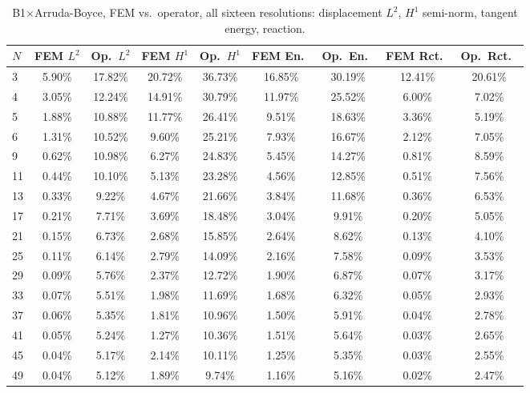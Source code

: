 \documentclass[final,5p,times]{elsarticle}
\begin{document}
\begin{table}[ht]
\centering
\caption{B1$\times$Arruda-Boyce, FEM vs.\ operator, all sixteen
  resolutions: displacement $L^2$, $H^1$ semi-norm, tangent energy,
  reaction.}
\label{tab:b1-b1ab-a}
\scriptsize
\begin{tabular}{lcccccccc}
\toprule
$N$ & FEM $L^2$ & Op.\ $L^2$ & FEM $H^1$ & Op.\ $H^1$ & FEM En.\ & Op.\ En.\ & FEM Rct.\ & Op.\ Rct.\ \\
\midrule
3  & 5.90\% & 17.82\% & 20.72\% & 36.73\% & 16.85\% & 30.19\% & 12.41\% & 20.61\% \\
4  & 3.05\% & 12.24\% & 14.91\% & 30.79\% & 11.97\% & 25.52\% & 6.00\%  & 7.02\%  \\
5  & 1.88\% & 10.88\% & 11.77\% & 26.41\% & 9.51\%  & 18.63\% & 3.36\%  & 5.19\%  \\
6  & 1.31\% & 10.52\% & 9.60\%  & 25.21\% & 7.93\%  & 16.67\% & 2.12\%  & 7.05\%  \\
9  & 0.62\% & 10.98\% & 6.27\%  & 24.83\% & 5.45\%  & 14.27\% & 0.81\%  & 8.59\%  \\
11 & 0.44\% & 10.10\% & 5.13\%  & 23.28\% & 4.56\%  & 12.85\% & 0.51\%  & 7.56\%  \\
13 & 0.33\% & 9.22\%  & 4.67\%  & 21.66\% & 3.84\%  & 11.68\% & 0.36\%  & 6.53\%  \\
17 & 0.21\% & 7.71\%  & 3.69\%  & 18.48\% & 3.04\%  & 9.91\%  & 0.20\%  & 5.05\%  \\
21 & 0.15\% & 6.73\%  & 2.68\%  & 15.85\% & 2.64\%  & 8.62\%  & 0.13\%  & 4.10\%  \\
25 & 0.11\% & 6.14\%  & 2.79\%  & 14.09\% & 2.16\%  & 7.58\%  & 0.09\%  & 3.53\%  \\
29 & 0.09\% & 5.76\%  & 2.37\%  & 12.72\% & 1.90\%  & 6.87\%  & 0.07\%  & 3.17\%  \\
33 & 0.07\% & 5.51\%  & 1.98\%  & 11.69\% & 1.68\%  & 6.32\%  & 0.05\%  & 2.93\%  \\
37 & 0.06\% & 5.35\%  & 1.81\%  & 10.96\% & 1.50\%  & 5.91\%  & 0.04\%  & 2.78\%  \\
41 & 0.05\% & 5.24\%  & 1.27\%  & 10.36\% & 1.51\%  & 5.64\%  & 0.03\%  & 2.65\%  \\
45 & 0.04\% & 5.17\%  & 2.14\%  & 10.11\% & 1.25\%  & 5.35\%  & 0.03\%  & 2.55\%  \\
49 & 0.04\% & 5.12\%  & 1.89\%  & 9.74\%  & 1.16\%  & 5.16\%  & 0.02\%  & 2.47\%  \\
\bottomrule
\end{tabular}
\end{table}
\end{document}
